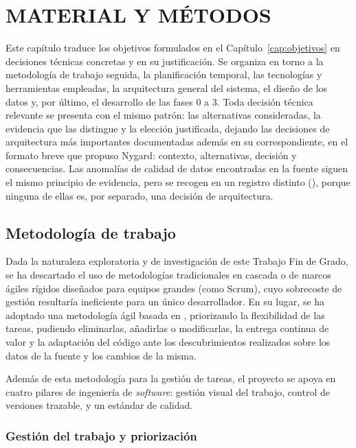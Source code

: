 \chapter{MATERIAL Y MÉTODOS}
\label{cap:materialesymetodos}

Este capítulo traduce los objetivos formulados en el Capítulo~\ref{cap:objetivos} en decisiones técnicas concretas y en su justificación. Se organiza en torno a la metodología de trabajo seguida, la planificación temporal, las tecnologías y herramientas empleadas, la arquitectura general del sistema, el diseño de los datos y, por último, el desarrollo de las fases 0 a 3. Toda decisión técnica relevante se presenta con el mismo patrón: las alternativas consideradas, la evidencia que las distingue y la elección justificada, dejando las decisiones de arquitectura más importantes documentadas además en su  correspondiente, en el formato breve que propuso Nygard\cite{nygard2011adr}: contexto, alternativas, decisión y consecuencias. Las anomalías de calidad de datos encontradas en la fuente siguen el mismo principio de evidencia, pero se recogen en un registro distinto (), porque ninguna de ellas es, por separado, una decisión de arquitectura.


\section{Metodología de trabajo}

Dada la naturaleza exploratoria y de investigación de este Trabajo Fin de Grado, se ha descartado el uso de metodologías tradicionales en cascada o de marcos ágiles rígidos diseñados para equipos grandes (como Scrum), cuyo sobrecoste de gestión resultaría ineficiente para un único desarrollador. En su lugar, se ha adoptado una metodología ágil basada en \textbf{}\cite{anderson2010kanban}, priorizando la flexibilidad de las tareas, pudiendo eliminarlas, añadirlas o modificarlas, la entrega continua de valor y la adaptación del código ante los descubrimientos realizados sobre los datos de la fuente y los cambios de la misma.

Además de esta metodología para la gestión de tareas, el proyecto se apoya en cuatro pilares de ingeniería de \textit{software}: gestión visual del trabajo, control de versiones trazable,  y un estándar de calidad.

\subsection{Gestión del trabajo y priorización}

